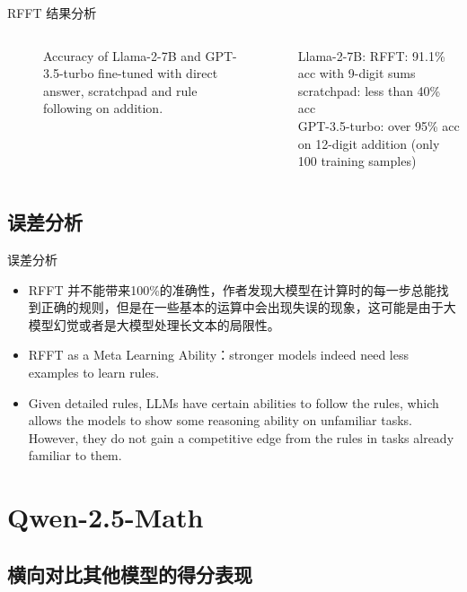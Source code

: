 \documentclass[aspectratio=169]{beamer}
\begin{document}
\begin{frame}{RFFT 结果分析}
\begin{columns}
\begin{column}{.7\textwidth}
\begin{figure}[t]
    \caption{Accuracy of Llama-2-7B and GPT-3.5-turbo fine-tuned with direct answer, scratchpad and rule following on addition.}
    \label{fig:rfft} 
    \vspace{-5pt}
\end{figure}
\end{column}
\begin{column}{.3\textwidth} Llama-2-7B: RFFT: 91.1\% acc with 9-digit sums\\[0.2cm] scratchpad: less than 40\% acc\\[0.2cm] GPT-3.5-turbo: over 95\% acc on 12-digit addition (only 100 training samples) \end{column}
\end{columns}
\end{frame}

\subsection{误差分析}
\begin{frame}{误差分析}
    \begin{itemize}
\item RFFT 并不能带来100\%的准确性，作者发现大模型在计算时的每一步总能找到正确的规则，但是在一些基本的运算中会出现失误的现象，这可能是由于大模型幻觉或者是大模型处理长文本的局限性。\\[0.4cm]
\pause
\item RFFT as a Meta Learning Ability：stronger models indeed need less examples to learn rules.\\[0.4cm]
\pause
\item Given detailed rules, LLMs have certain abilities to follow the rules, which allows the models to show some reasoning ability on unfamiliar tasks. However, they do not gain a competitive edge from the rules in tasks already familiar to them.
    \end{itemize}
\end{frame}

            



\section{Qwen-2.5-Math}

\subsection{横向对比其他模型的得分表现}
\end{document}
